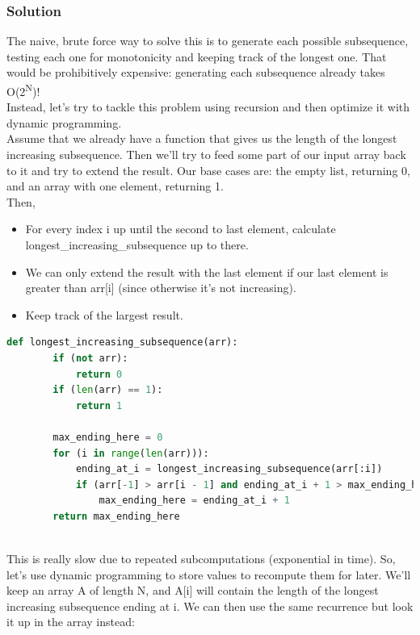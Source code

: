 \documentclass[12pt]{article}
\begin{document}
	\subsubsection{Solution}
	The naive, brute force way to solve this is to generate each possible subsequence, testing each one for monotonicity and keeping track of the longest one. That would be prohibitively expensive: generating each subsequence already takes O(2\textsuperscript{N})!\\
    Instead, let’s try to tackle this problem using recursion and then optimize it with dynamic programming.\\
    Assume that we already have a function that gives us the length of the longest increasing subsequence. Then we’ll try to feed some part of our input array back to it and try to extend the result. Our base cases are: the empty list, returning 0, and an array with one element, returning 1.\\
    Then,
    \begin{itemize}
        \item For every index i up until the second to last element, calculate longest\_increasing\_subsequence up to there.
        \item We can only extend the result with the last element if our last element is greater than arr[i] (since otherwise it’s not increasing).
        \item Keep track of the largest result.
    \end{itemize}
    
    \begin{lstlisting}[language=Python]
	def longest_increasing_subsequence(arr):
        if (not arr):
            return 0
        if (len(arr) == 1):
            return 1
    
        max_ending_here = 0
        for (i in range(len(arr))):
            ending_at_i = longest_increasing_subsequence(arr[:i])
            if (arr[-1] > arr[i - 1] and ending_at_i + 1 > max_ending_here):
                max_ending_here = ending_at_i + 1
        return max_ending_here
        
    \end{lstlisting}
    
    This is really slow due to repeated subcomputations (exponential in time). So, let’s use dynamic programming to store values to recompute them for later.
    \newpage
    We’ll keep an array A of length N, and A[i] will contain the length of the longest increasing subsequence ending at i. We can then use the same recurrence but look it up in the array instead:
    
\end{document}
